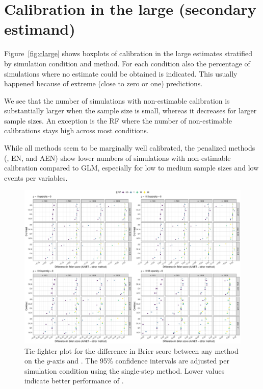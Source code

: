 \documentclass[a4paper, 11pt]{article}
\begin{document}
\section{Calibration in the large (secondary estimand)}
Figure~\ref{fig:clarge} shows boxplots of calibration in the large estimates
stratified by simulation condition and method. For each condition also the
percentage of simulations where no estimate could be obtained is indicated.
This usually happened because of extreme (close to zero or one) predictions.

We see that the number of simulations with non-estimable calibration is
substantially larger when the sample size is small, whereas it decreases for
larger sample sizes. An exception is the RF where the number of non-estimable
calibrations stays high across most conditions.

While all methods seem to be marginally well calibrated, the penalized methods
(\ainet{}, EN, and AEN) show lower numbers of simulations with non-estimable
calibration compared to GLM, especially for low to medium sample sizes and low
events per variables.

\begin{landscape}
\begin{figure}[!ht]
\center
\includegraphics[width=0.8\linewidth]{figures-appendix/tie-fighter_brier_sparsity0.pdf}
\caption{Tie-fighter plot for the difference in Brier score between any method
  on the $y$-axis and \ainet{}. The 95\% confidence intervals are adjusted per
  simulation condition using the single-step method. Lower values indicate
  better performance of \ainet{}. } \label{fig:tiebrier}
\end{figure}
\end{landscape}
\end{document}
